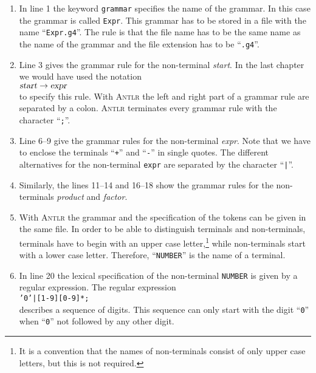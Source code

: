 \begin{enumerate}
\item In line 1 the keyword \texttt{grammar} specifies the name of the grammar.
      In this case the grammar is called \texttt{Expr}.  This grammar has to be stored in a file with the name 
      ``\texttt{Expr.g4}''.  The rule is that the file name has to be the same name as the name of the grammar
      and the file extension has to be ``\texttt{.g4}''.  
\item Line 3 gives the grammar rule for the non-terminal \textsl{start}.  In the last chapter we would have used the
      notation \\[0.2cm]
      \hspace*{1.3cm}
      $\textsl{start} \rightarrow \textsl{expr}$
      \\[0.2cm]
      to specify this rule.  With \textsc{Antlr} the left and right part of a grammar rule are separated by a colon.
      \textsc{Antlr} terminates every grammar rule with the character ``\texttt{;}''.
\item Line 6--9 give the grammar rules for the non-terminal \textsl{expr}.  Note that we have to enclose the 
      terminals ``\texttt{+}'' and ``\texttt{-}'' in single quotes.  The different alternatives for the non-terminal
      \texttt{expr} are separated by the character ``\texttt{|}''.
\item Similarly, the lines 11--14 and 16--18 show the grammar rules for the non-terminals \textsl{product} and
      \textsl{factor}.   
\item With \textsc{Antlr} the grammar and the specification of the tokens can be given in the same file.
      In order to be able to distinguish terminals and non-terminals, terminals have to begin with an upper case 
      letter,\footnote
      {It is a convention that the names of non-terminals consist of only upper case letters, but this is not required.}
      while non-terminals start with a lower case letter.   Therefore, ``\texttt{NUMBER}'' is the name
      of a terminal.
\item In line 20 the lexical specification of the non-terminal \texttt{NUMBER} is given
      by a regular expression.  The regular expression
      \\[0.2cm]
      \hspace*{1.3cm}
      \texttt{'0'|[1-9][0-9]*;}
      \\[0.2cm]
      describes a sequence of digits.  This sequence can only start with the digit
      ``\texttt{0}'' when ``\texttt{0}'' not followed by any other digit.


\end{enumerate}

